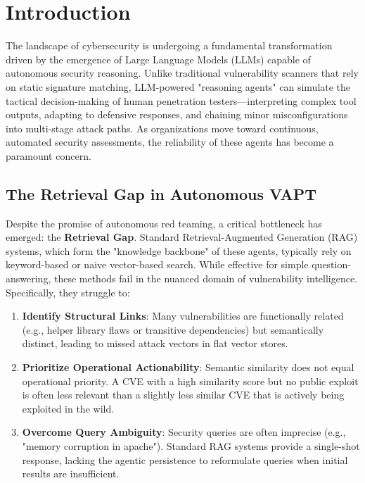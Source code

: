 \section{Introduction}
\label{sec:intro}

The landscape of cybersecurity is undergoing a fundamental transformation driven by the emergence of Large Language Models (LLMs) capable of autonomous security reasoning. Unlike traditional vulnerability scanners that rely on static signature matching, LLM-powered "reasoning agents" can simulate the tactical decision-making of human penetration testers—interpreting complex tool outputs, adapting to defensive responses, and chaining minor misconfigurations into multi-stage attack paths. As organizations move toward continuous, automated security assessments, the reliability of these agents has become a paramount concern.

\subsection{The Retrieval Gap in Autonomous VAPT}
Despite the promise of autonomous red teaming, a critical bottleneck has emerged: the \textbf{Retrieval Gap}. Standard Retrieval-Augmented Generation (RAG) systems, which form the "knowledge backbone" of these agents, typically rely on keyword-based or naive vector-based search. While effective for simple question-answering, these methods fail in the nuanced domain of vulnerability intelligence. Specifically, they struggle to:
\begin{enumerate}
    \item \textbf{Identify Structural Links}: Many vulnerabilities are functionally related (e.g., helper library flaws or transitive dependencies) but semantically distinct, leading to missed attack vectors in flat vector stores.
    \item \textbf{Prioritize Operational Actionability}: Semantic similarity does not equal operational priority. A CVE with a high similarity score but no public exploit is often less relevant than a slightly less similar CVE that is actively being exploited in the wild.
    \item \textbf{Overcome Query Ambiguity}: Security queries are often imprecise (e.g., "memory corruption in apache"). Standard RAG systems provide a single-shot response, lacking the agentic persistence to reformulate queries when initial results are insufficient.
\end{enumerate}

